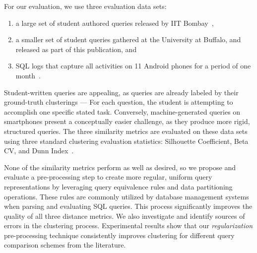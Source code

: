 For our evaluation, we use three evaluation data sets:
\begin{enumerate}
\item a large set of student authored queries released by IIT Bombay~\cite{chandra2015Data},
\item a smaller set of student queries gathered at 
the University at Buffalo,
and released as part of this publication, and
\item SQL logs that capture all activities on 11 Android phones for a period of one month~\cite{pocketdata}.
\end{enumerate}
Student-written queries are appealing, as queries are already labeled by their ground-truth clusterings --- For each question, the student is attempting to accomplish one specific stated task.
Conversely, machine-generated queries on smartphones present a conceptually easier challenge, as they produce more rigid, structured queries.
The three similarity metrics are evaluated on these data sets using three standard clustering evaluation statistics: Silhouette Coefficient, Beta CV, and Dunn Index~\cite{zaki2014data}. 
%

None of the similarity metrics perform as well as desired, so we propose and evaluate a pre-processing step to create more regular, uniform query representations by leveraging query equivalence rules and data partitioning operations. These rules are commonly utilized by database management systems when parsing and evaluating SQL queries.
This process significantly improves the quality of all three distance metrics.
We also investigate and identify sources of errors in the clustering process. 
Experimental results show that our \emph{regularization} pre-processing technique consistently improves clustering for different query comparison schemes from the literature.

